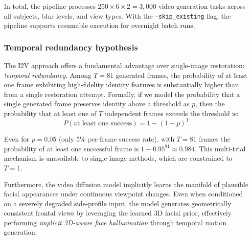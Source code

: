In total, the pipeline processes
$250 \times 6 \times 2 = 3{,}000$ video generation tasks across
all subjects, blur levels, and view types.  With the
\texttt{--skip\_existing} flag, the pipeline supports resumable
execution for overnight batch runs.

\subsubsection{Temporal redundancy hypothesis}
\label{subsubsec:temporal_redundancy}

The I2V approach offers a fundamental advantage over single-image
restoration: \emph{temporal redundancy}.  Among $T = 81$ generated
frames, the probability of at least one frame exhibiting
high-fidelity identity features is substantially higher than
from a single restoration attempt.  Formally, if we model the
probability that a single generated frame preserves identity above
a threshold as $p$, then the probability that at least one of $T$
independent frames exceeds the threshold is:
\begin{equation}
    P(\text{at least one success}) = 1 - (1-p)^T.
    \label{eq:temporal_redundancy}
\end{equation}

Even for $p = 0.05$ (only 5\% per-frame success rate), with
$T = 81$ frames the probability of at least one successful frame
is $1 - 0.95^{81} \approx 0.984$.\;  This multi-trial mechanism
is unavailable to single-image methods, which are constrained to
$T = 1$.

Furthermore, the video diffusion model implicitly learns the
manifold of plausible facial appearances under continuous viewpoint
changes.  Even when conditioned on a severely degraded side-profile
input, the model generates geometrically consistent frontal views
by leveraging the learned 3D facial prior, effectively performing
\emph{implicit 3D-aware face hallucination} through temporal
motion generation.
